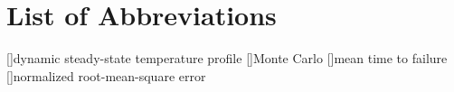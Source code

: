 \chapter*{List of Abbreviations}

\begin{acronym}[NRMSE]
[]{dynamic steady-state temperature profile}
[]{Monte Carlo}
[]{mean time to failure}
[]{normalized root-mean-square error}
\end{acronym}
